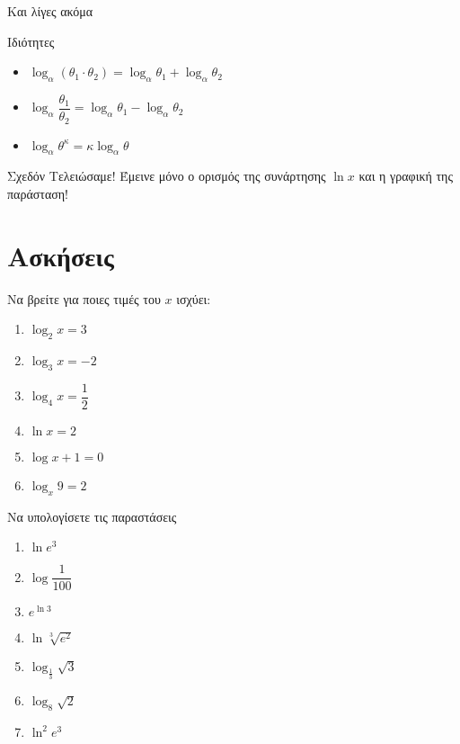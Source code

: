\documentclass{../presentation}
\begin{document}
\begin{frame}[label=Ιδιότητες]{Και λίγες ακόμα}
  \begin{block}{Ιδιότητες}
    \begin{itemize}
      \item<1-> $\log_α\left( θ_1\cdot θ_2 \right)=\log_αθ_1+\log_αθ_2 $
      \item<2-> $\log_α\dfrac{θ_1}{θ_2}=\log_αθ_1-\log_αθ_2 $
      \item<3-> $\log_αθ^κ=κ\log_αθ$
    \end{itemize}
  \end{block}
  \hyperlink{Απόδειξη1}{}
\end{frame}

\begin{frame}{Σχεδόν Τελειώσαμε!}
  Έμεινε μόνο ο ορισμός της συνάρτησης $\ln x$ και η γραφική της παράσταση!
\end{frame}

\section{Ασκήσεις}
\begin{askisi}
  Να βρείτε για ποιες τιμές του $x$ ισχύει:
  \begin{enumerate}
    \item<1-> $\log_2x=3$
    \item<2-> $\log_3x=-2$
    \item<3-> $\log_4x=\dfrac{1}{2}$
    \item<4-> $\ln x=2$
    \item<5-> $\log x+1=0$
    \item<6-> $\log_x9=2$
  \end{enumerate}


\end{askisi}

\begin{askisi}
  Να υπολογίσετε τις παραστάσεις
  \begin{enumerate}
    \item<1-> $\ln e^3$
    \item<2-> $\log\dfrac{1}{100}$
    \item<3-> $e^{\ln 3}$
    \item<4-> $\ln \sqrt[3]{e^2}$
    \item<5-> $\log_{\frac{1}{3}}\sqrt{3}$
    \item<6-> $\log_8\sqrt{2}$
    \item<7-> $\ln^2e^3$
  \end{enumerate}

  \hyperlink{Θεωρία1}{}

\end{askisi}
\end{document}
